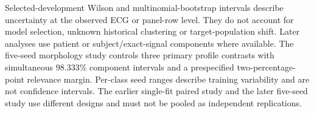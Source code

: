 Selected-development Wilson and multinomial-bootstrap intervals describe uncertainty at the observed ECG or panel-row level. They do not account for model selection, unknown historical clustering or target-population shift. Later analyses use patient or subject/exact-signal components where available. The five-seed morphology study controls three primary profile contrasts with simultaneous 98.333\% component intervals and a prespecified two-percentage-point relevance margin. Per-class seed ranges describe training variability and are not confidence intervals. The earlier single-fit paired study and the later five-seed study use different designs and must not be pooled as independent replications.
